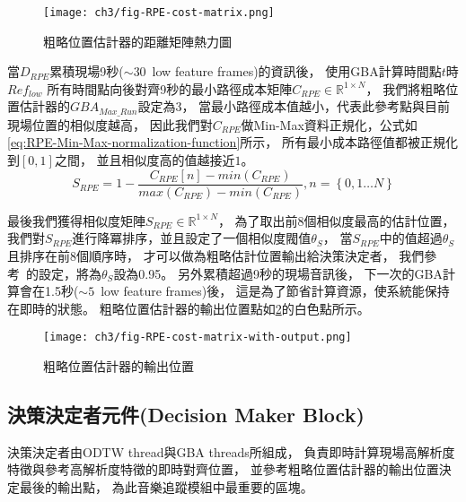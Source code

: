 \documentclass[class=NCU_thesis, crop=false]{standalone}
\begin{document}
\begin{figure}[H]
    \centering
    \texttt{[image: ch3/fig-RPE-cost-matrix.png]}
    \caption{粗略位置估計器的距離矩陣熱力圖}
    \label{fig:fig-ch3-RPE-cost-matrix}
\end{figure}

當$D_{RPE}$累積現場9秒($\sim 30$\ low feature frames)的資訊後，
使用GBA計算時間點$t$時$Ref_{low}$
所有時間點向後對齊9秒的最小路徑成本矩陣$C_{RPE} \in \mathbb{R}^{1 \times N}$，
我們將粗略位置估計器的$GBA_{Max\_Run}$設定為3，
當最小路徑成本值越小，代表此參考點與目前現場位置的相似度越高，
因此我們對$C_{RPE}$做Min-Max資料正規化，公式如\cref{eq:RPE-Min-Max-normalization-function}所示，
所有最小成本路徑值都被正規化到$[0,1]$之間，
並且相似度高的值越接近$1$。
\begin{equation}
    \label{eq:RPE-Min-Max-normalization-function}
    S_{RPE} = 1-\frac{C_{RPE}[n]-min(C_{RPE})}{max(C_{RPE})-min(C_{RPE})},
    n = \left\{0, 1 \ldots N\right\} 
\end{equation}

最後我們獲得相似度矩陣$S_{RPE} \in \mathbb{R}^{1 \times N}$，
為了取出前8個相似度最高的估計位置，
我們對$S_{RPE}$進行降冪排序，並且設定了一個相似度閥值$\theta _{S}$，
當$S_{RPE}$中的值超過$\theta _{S}$且排序在前8個順序時，
才可以做為粗略估計位置輸出給決策決定者，
我們參考~\cite{Arzt2010Towards}的設定，將為$\theta _{S}$設為0.95。
另外累積超過9秒的現場音訊後，
下一次的GBA計算會在1.5秒($\sim 5$\ low feature frames)後，
這是為了節省計算資源，使系統能保持在即時的狀態。
粗略位置估計器的輸出位置點如\cref{fig:fig-ch3-RPE-cost-matrix-with-output}的白色點所示。
\begin{figure}[H]
    \centering
    \texttt{[image: ch3/fig-RPE-cost-matrix-with-output.png]}
    \caption{粗略位置估計器的輸出位置}
    \label{fig:fig-ch3-RPE-cost-matrix-with-output}
\end{figure}


\subsection{決策決定者元件(Decision Maker Block)} \label{ch3-subst-decision-maker}
決策決定者由ODTW thread與GBA threads所組成，
負責即時計算現場高解析度特徵與參考高解析度特徵的即時對齊位置，
並參考粗略位置估計器的輸出位置決定最後的輸出點，
為此音樂追蹤模組中最重要的區塊。
\end{document}
